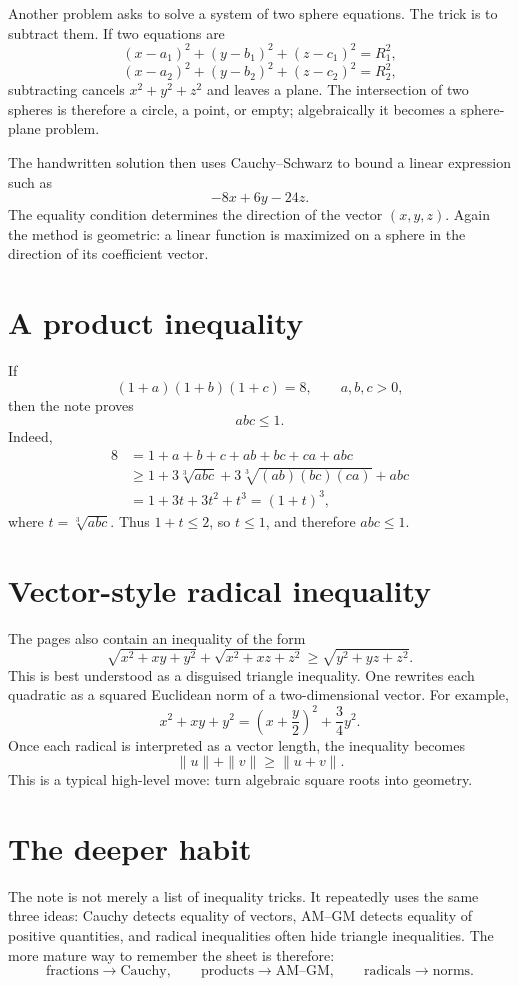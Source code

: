Another problem asks to solve a system of two sphere equations.  The trick is to subtract them.  If two equations are
\[
  (x-a_1)^2+(y-b_1)^2+(z-c_1)^2=R_1^2,
\]
\[
  (x-a_2)^2+(y-b_2)^2+(z-c_2)^2=R_2^2,
\]
subtracting cancels \(x^2+y^2+z^2\) and leaves a plane.  The intersection of two spheres is therefore a circle, a point, or empty; algebraically it becomes a sphere-plane problem.

The handwritten solution then uses Cauchy--Schwarz to bound a linear expression such as
\[
  -8x+6y-24z.
\]
The equality condition determines the direction of the vector \((x,y,z)\).  Again the method is geometric: a linear function is maximized on a sphere in the direction of its coefficient vector.

\section{A product inequality}

If
\[
  (1+a)(1+b)(1+c)=8,\qquad a,b,c>0,
\]
then the note proves
\[
  abc\le1.
\]
Indeed,
\[
\begin{aligned}
8&=1+a+b+c+ab+bc+ca+abc\\
&\ge 1+3\sqrt[3]{abc}+3\sqrt[3]{(ab)(bc)(ca)}+abc\\
&=1+3t+3t^2+t^3=(1+t)^3,
\end{aligned}
\]
where \(t=\sqrt[3]{abc}\).  Thus \(1+t\le2\), so \(t\le1\), and therefore \(abc\le1\).

\section{Vector-style radical inequality}

The pages also contain an inequality of the form
\[
  \sqrt{x^2+xy+y^2}+\sqrt{x^2+xz+z^2}\ge \sqrt{y^2+yz+z^2}.
\]
This is best understood as a disguised triangle inequality.  One rewrites each quadratic as a squared Euclidean norm of a two-dimensional vector.  For example,
\[
  x^2+xy+y^2=\left(x+\frac y2\right)^2+\frac34y^2.
\]
Once each radical is interpreted as a vector length, the inequality becomes
\[
  \|u\|+\|v\|\ge\|u+v\|.
\]
This is a typical high-level move: turn algebraic square roots into geometry.

\section{The deeper habit}

The note is not merely a list of inequality tricks.  It repeatedly uses the same three ideas: Cauchy detects equality of vectors, AM--GM detects equality of positive quantities, and radical inequalities often hide triangle inequalities.  The more mature way to remember the sheet is therefore:
\[
  \text{fractions}\to\text{Cauchy},\qquad
  \text{products}\to\text{AM--GM},\qquad
  \text{radicals}\to\text{norms}.
\]

